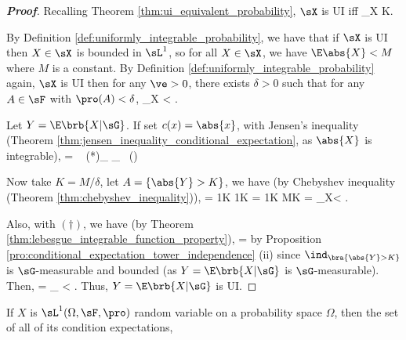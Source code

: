 \begin{proof}[\bf Proof]
Recalling Theorem \ref{thm:ui_equivalent_probability}, $\sX$ is UI iff
\be
\sup\limits_{X\in \sX} \E{}  K\to \infty.
\ee

By Definition \ref{def:uniformly_integrable_probability}, we have that if $\sX$ is UI then $X\in \sX$ is bounded in $\sL^1$, so for all $X\in \sX$, we have
$\E\abs{X} < M$ where $M$ is a constant. By Definition \ref{def:uniformly_integrable_probability} again, $\sX$ is UI then for any $\ve>0$, there exists $\delta >0$ such that for any $A\in \sF$ with $\pro(A) <\delta$,
\be
\sup_{X\in \sX} < \ve.
\ee

Let $Y= \E\brb{X|\sG}$. If set $c(x) = \abs{x}$, with Jensen's inequality (Theorem \ref{thm:jensen_inequality_conditional_expectation}, as $\abs{X}$ is integrable),
\be
{} =  \leq \E{}\  \quad (*)\quad\ra\quad  {}\ind_{} \leq \E{}\ind_{}\  \quad (\dag)
\ee

Now take $K = M/\delta$, let $A = \{\abs{Y} > K\}$, we have (by Chebyshev inequality (Theorem \ref{thm:chebyshev_inequality})),
\be
\pro{} = \pro{} \leq \frac 1K \E{} \stackrel{(*)}{\leq} \frac 1K\E{} = \frac 1K\E{} \leq \frac MK = \delta \quad\ra\quad \sup_{X\in \sX}< \ve.
\ee

Also, with $(\dag)$, we have (by Theorem \ref{thm:lebesgue_integrable_function_property}),
\be
\E{} \leq \E{} = \E{}
\ee
by Proposition \ref{pro:conditional_expectation_tower_independence} (ii) since $\ind_{\bra{\abs{Y}>K}}$ is $\sG$-measurable and bounded (as $Y = \E\brb{X|\sG}$ is $\sG$-measurable). Then,
\be
\E{} \leq \E{} = _{} < \ve.
\ee
Thus, $Y = \E\brb{X|\sG}$ is UI.
\end{proof}

\begin{corollary}\label{cor:single_integrable_conditional_expectation_implies_ui}
If $X$ is $\sL^1(\Omega,\sF,\pro)$ random variable on a probability space $\Omega$, then the set of all of its condition expectations,
\be
{}\quad {}
\ee
\end{corollary}

